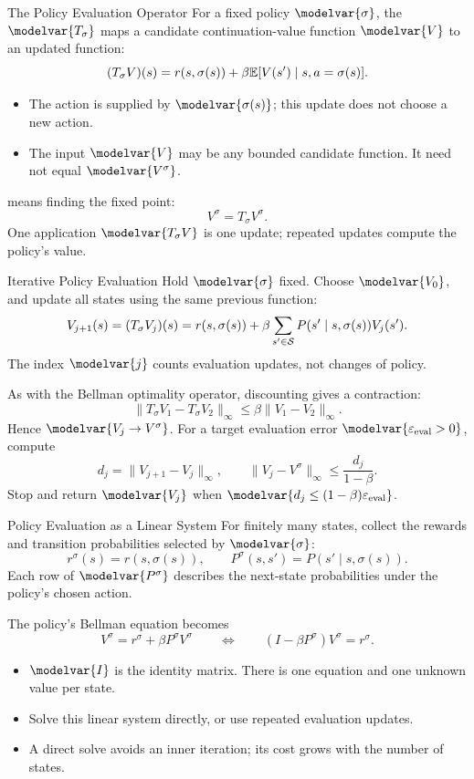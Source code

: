 \begin{frame}{The Policy Evaluation Operator}
\small
For a fixed policy \(\modelvar{\sigma}\), the  \(\modelvar{T_\sigma}\) maps a candidate continuation-value function \(\modelvar{V}\) to an updated function:
\[
(T_\sigma V)(s)=r(s,\sigma(s))+\beta\mathbb E[V(s')\mid s,a=\sigma(s)].
\]
\begin{itemize}
\item The action is supplied by \(\modelvar{\sigma(s)}\); this update does not choose a new action.
\item The input \(\modelvar{V}\) may be any bounded candidate function. It need not equal \(\modelvar{V^\sigma}\).
\end{itemize}
\par\medskip
{} means finding the fixed point:
\[V^\sigma=T_\sigma V^\sigma.\]
One application \(\modelvar{T_\sigma V}\) is one update; repeated updates compute the policy's value.
\end{frame}

\begin{frame}{Iterative Policy Evaluation}
\small
Hold \(\modelvar{\sigma}\) fixed. Choose \(\modelvar{V_0}\), and update all states using the same previous function:
\[
V_{j+1}(s)=(T_\sigma V_j)(s)
=r(s,\sigma(s))+\beta\sum_{s'\in\mathcal S}P(s'\mid s,\sigma(s))V_j(s').
\]
The index \(\modelvar{j}\) counts evaluation updates, not changes of policy.
\par\medskip
As with the Bellman optimality operator, discounting gives a contraction:
\[\|T_\sigma V_1-T_\sigma V_2\|_\infty\leq\beta\|V_1-V_2\|_\infty.\]
Hence \(\modelvar{V_j\to V^\sigma}\). For a target evaluation error \(\modelvar{\varepsilon_{\rm eval}>0}\), compute
\[
d_j=\|V_{j+1}-V_j\|_\infty,
\qquad
\|V_j-V^\sigma\|_\infty\leq\frac{d_j}{1-\beta}.
\]
Stop and return \(\modelvar{V_j}\) when \(\modelvar{d_j\leq(1-\beta)\varepsilon_{\rm eval}}\).
\end{frame}

\begin{frame}{Policy Evaluation as a Linear System}
\small
For finitely many states, collect the rewards and transition probabilities selected by \(\modelvar{\sigma}\):
\[
r^\sigma(s)=r(s,\sigma(s)),\qquad
P^\sigma(s,s')=P(s'\mid s,\sigma(s)).
\]
Each row of \(\modelvar{P^\sigma}\) describes the next-state probabilities under the policy's chosen action.
\par\medskip
The policy's Bellman equation becomes
\[
V^\sigma=r^\sigma+\beta P^\sigma V^\sigma
\qquad\Longleftrightarrow\qquad
(I-\beta P^\sigma)V^\sigma=r^\sigma.
\]
\begin{itemize}
\item \(\modelvar{I}\) is the identity matrix. There is one equation and one unknown value per state.
\item Solve this linear system directly, or use repeated evaluation updates.
\item A direct solve avoids an inner iteration; its cost grows with the number of states.
\end{itemize}
\end{frame}


